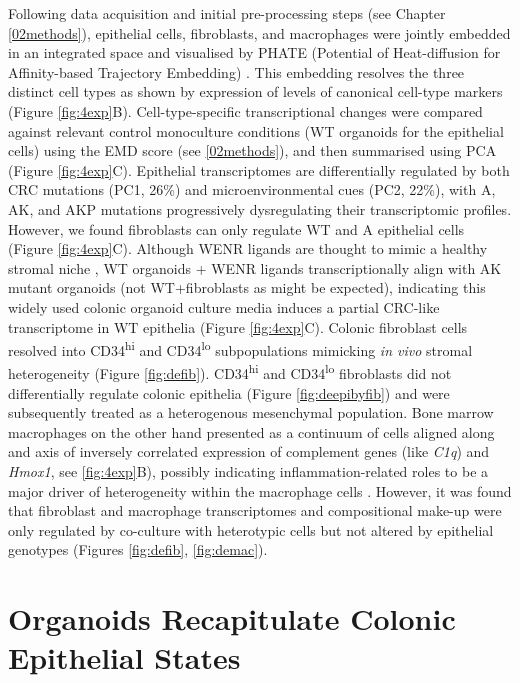 Following data acquisition and initial pre-processing steps (see Chapter \ref{02methods}), epithelial cells, fibroblasts, and macrophages were jointly embedded in an integrated space and visualised by PHATE (Potential of Heat-diffusion for Affinity-based Trajectory Embedding) \cite{moon_visualizing_2019}. This embedding resolves the three distinct cell types as shown by expression of levels of canonical cell-type markers (Figure \ref{fig:4exp}B). 
Cell-type-specific transcriptional changes were compared against relevant control monoculture conditions (WT organoids for the epithelial cells) using the EMD score (see \ref{02methods}), and then summarised using PCA (Figure \ref{fig:4exp}C). Epithelial transcriptomes are differentially regulated by both CRC mutations (PC1, 26\%) and microenvironmental cues (PC2, 22\%), with A, AK, and AKP mutations progressively dysregulating their transcriptomic profiles. However, we found fibroblasts can only regulate WT and A epithelial cells (Figure \ref{fig:4exp}C). Although WENR ligands are thought to mimic a healthy stromal niche \cite{mahe_establishment_2013}, WT organoids + WENR ligands transcriptionally align with AK mutant organoids (not WT+fibroblasts as might be expected), indicating this widely used colonic organoid culture media induces a partial CRC-like transcriptome in WT epithelia (Figure \ref{fig:4exp}C).
Colonic fibroblast cells resolved into CD34\textsuperscript{hi} and CD34\textsuperscript{lo} subpopulations mimicking \textit{in vivo} stromal heterogeneity \cite{karpus_colonic_2019} (Figure \ref{fig:defib}). CD34\textsuperscript{hi} and CD34\textsuperscript{lo} fibroblasts did not differentially regulate colonic epithelia (Figure \ref{fig:deepibyfib}) and were subsequently treated as a heterogenous mesenchymal population. Bone marrow macrophages on the other hand presented as a continuum of cells aligned along and axis of inversely correlated expression of complement genes (like \emph{C1q}) and \emph{Hmox1}, see \ref{fig:4exp}B), possibly indicating inflammation-related roles to be a major driver of heterogeneity within the macrophage cells \cite{naito_heme_2014}. However, it was found that fibroblast and macrophage transcriptomes and compositional make-up were only regulated by co-culture with heterotypic cells but not altered by epithelial genotypes (Figures \ref{fig:defib}, \ref{fig:demac}). 


\section{Organoids Recapitulate Colonic Epithelial States}

